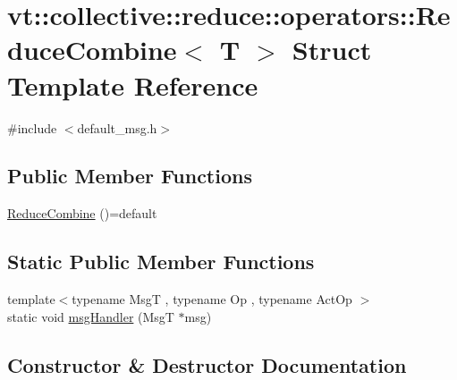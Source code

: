 \hypertarget{structvt_1_1collective_1_1reduce_1_1operators_1_1_reduce_combine}{}\section{vt\+:\+:collective\+:\+:reduce\+:\+:operators\+:\+:Reduce\+Combine$<$ T $>$ Struct Template Reference}
\label{structvt_1_1collective_1_1reduce_1_1operators_1_1_reduce_combine}


{\ttfamily \#include $<$default\+\_\+msg.\+h$>$}

\subsection*{Public Member Functions}
\begin{DoxyCompactItemize}
\item 
\hyperlink{structvt_1_1collective_1_1reduce_1_1operators_1_1_reduce_combine_a361c495fceb4ef21a440ee29b425b1f9}{Reduce\+Combine} ()=default
\end{DoxyCompactItemize}
\subsection*{Static Public Member Functions}
\begin{DoxyCompactItemize}
\item 
{\footnotesize template$<$typename MsgT , typename Op , typename Act\+Op $>$ }\\static void \hyperlink{structvt_1_1collective_1_1reduce_1_1operators_1_1_reduce_combine_aa1657dc492475bc1d82d1dc282ee37ce}{msg\+Handler} (MsgT $\ast$msg)
\end{DoxyCompactItemize}


\subsection{Constructor \& Destructor Documentation}
\mbox{\label{structvt_1_1collective_1_1reduce_1_1operators_1_1_reduce_combine_a361c495fceb4ef21a440ee29b425b1f9}} 
